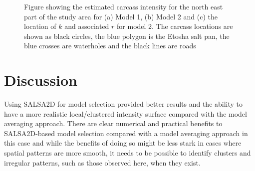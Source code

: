 \documentclass[letterpaper]{interact}
\begin{document}
\begin{figure}[!ht]
    \begin{subfloat}[Yellow dots = positive coefficient,  purple dots =  negative coefficient. The size of the coloured dots is proportional to the size of $r$]{%
    }
    \hspace{5pt}
    \end{subfloat}
     \caption{Figure showing the estimated carcass intensity for the north east part of the study area for (a) Model 1, (b) Model 2 and (c) the location of $k$ and associated $r$ for model 2. The carcass locations are shown as black circles, the blue polygon is the Etosha salt pan, the blue crosses are waterholes and the black lines are roads}
        \label{fig:zoomplots}
\end{figure}

\clearpage
\newpage


\section{Discussion}\label{discussion}

Using SALSA2D for model selection provided better results and the ability to have a more realistic local/clustered intensity surface compared with the model averaging approach. There are clear numerical and practical benefits to SALSA2D-based model selection compared with a model averaging approach in this case and while the benefits of doing so might be less stark in cases where spatial patterns are more smooth, it needs to be possible to identify clusters and irregular patterns, such as those observed here, when they exist. 
\end{document}
